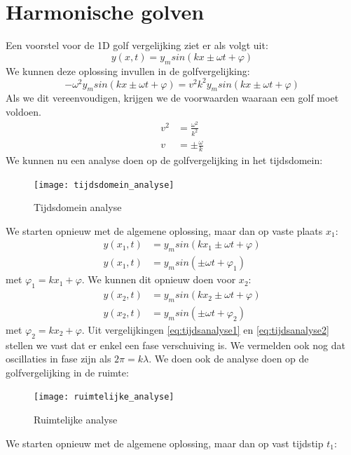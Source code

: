 \documentclass[a4paper,kul]{kulakarticle} %
\begin{document}
\section{Harmonische golven}
Een voorstel voor de 1D golf vergelijking ziet er als volgt uit:
\begin{equation*}
	y(x,t) = y_msin(kx \pm \omega t +\varphi)
\end{equation*}
We kunnen deze oplossing invullen in de golfvergelijking:
\begin{equation*}
	-\omega^2y_msin(kx \pm \omega t +\varphi)=v^2k^2y_msin(kx \pm \omega t +\varphi)
\end{equation*}
Als we dit vereenvoudigen, krijgen we de voorwaarden waaraan een golf moet voldoen.
\begin{align*}
	v^2 & = \frac{\omega^2}{k^2}\\
	v & = \pm\frac{\omega}{k}
\end{align*}
We kunnen nu een analyse doen op de golfvergelijking in het tijdsdomein:\\
\begin{figure}[h]
	\centering
	\texttt{[image: tijdsdomein\_analyse]}
	\caption[Tijdsdomein analyse]{Tijdsdomein analyse}
	\label{fig:tijdsdomein}
\end{figure}
We starten opnieuw met de algemene oplossing, maar dan op vaste plaats $x_1$:
\begin{align}
	y(x_1,t) &= y_msin(kx_1 \pm \omega t +\varphi)\\
	\label{eq:tijdsanalyse1}
	y(x_1,t) &= y_msin(\pm \omega t +\varphi_1)
\end{align}
met $\varphi_1 = kx_1 +\varphi$. We kunnen dit opnieuw doen voor $x_2$:
\begin{align}
	y(x_2,t) &= y_msin(kx_2 \pm \omega t +\varphi)\\
	\label{eq:tijdsanalyse2}
	y(x_2,t) &= y_msin(\pm \omega t +\varphi_2)
\end{align}
met $\varphi_2 = kx_2 +\varphi$. Uit vergelijkingen \ref{eq:tijdsanalyse1} en \ref{eq:tijdsanalyse2} stellen we vast dat er enkel een fase verschuiving is. We vermelden ook nog dat oscillaties in fase zijn als $2\pi = k\lambda$.
\newpage
We doen ook de analyse doen op de golfvergelijking in de ruimte:\\
\begin{figure}[h]
	\centering
	\texttt{[image: ruimtelijke\_analyse]}
	\caption[Ruimtelijke analyse]{Ruimtelijke analyse}
	\label{fig:ruimtelijkeanalyse}
\end{figure}
We starten opnieuw met de algemene oplossing, maar dan op vast tijdstip $t_1$:
\end{document}
